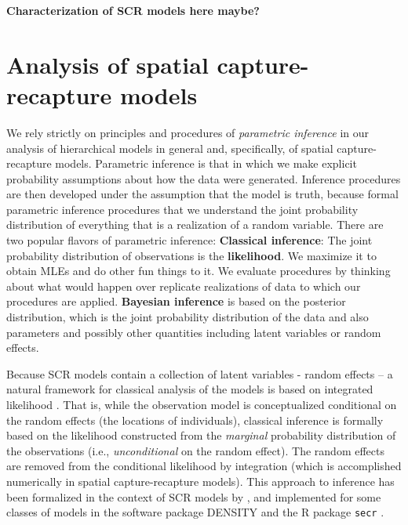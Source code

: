 {\bf Characterization of SCR models here maybe?}


\section{Analysis of spatial capture-recapture models}

We rely strictly on principles and procedures of {\it parametric
  inference} in our analysis of hierarchical models in general and,
specifically, of spatial capture-recapture models. Parametric
inference is that in which we make explicit probability assumptions
about how the data were generated. Inference procedures are then
developed under the assumption that the model is truth, because formal
parametric inference procedures that we understand the joint
probability distribution of everything that is a realization of a
random variable. There are two popular flavors of parametric
inference: {\bf Classical inference}: The joint probability distribution
of observations is the {\bf likelihood}. We maximize it to obtain MLEs
and do other fun things to it. We evaluate procedures by thinking
about what would happen over replicate realizations of data to which
our procedures are applied.  {\bf Bayesian inference} is based on the
posterior distribution, which is the joint probability distribution of
the data and also parameters and possibly other quantities including
latent variables or random effects.

Because SCR models contain a collection of latent variables - random
effects -- a natural framework for classical analysis of the models is
based on integrated likelihood \citep{laird_ware:1982,berger_etal:1999}. That is, while
the observation model is conceptualized conditional on the random
effects (the locations of individuals), classical inference is
formally based on the likelihood constructed from the {\it marginal}
probability distribution of the observations (i.e., {\it
  unconditional} on the random effect). The random effects are removed
from the conditional likelihood by integration (which is accomplished
numerically in spatial capture-recapture models). This approach to
inference has been formalized in the context of SCR models by
\citet{borchers_efford:2008, efford:2011}, and implemented for some
classes of models in the software package DENSITY \citep{efford:2004}
and the R package \mbox{\tt secr} \citep{efford:XYZ}.

